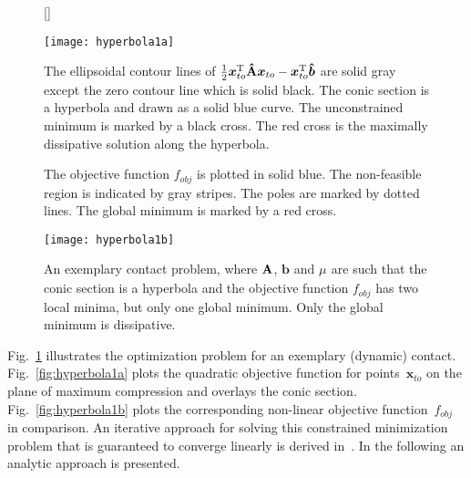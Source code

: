\documentclass[global,twocolumn]{svjour}
\let\vec\bm
\newcommand{\mat}[1]{{\bf #1}}
\newcommand{\transp}{{\mathrm{T}}}
\newcommand{\cof}[1]{\ensuremath{\mu_{#1}}}
\renewcommand{\figref}[1]{Fig.~\ref{#1}}
\begin{document}
			\begin{figure}
				\centering
					{
						\begin{subfloatrow}[1]%
								{\texttt{[image: hyperbola1a]}}
								{\caption{The ellipsoidal contour lines of $\frac{1}{2} \vec x_{to}^\transp \mat{\hat{A}} \vec x_{to} - \vec x_{to}^\transp \vec{\hat{b}}$ are solid gray except the zero contour line which is solid black. The conic section is a hyperbola and drawn as a solid blue curve. The unconstrained minimum is marked by a black cross. The red cross is the maximally dissipative solution along the hyperbola.}\label{fig:hyperbola1a}}
						\end{subfloatrow}
						\vspace{\parskip}

						\begin{subfloatrow}[1]%
							\floatbox{figure}
								{\caption{The objective function $f_{obj}$ is plotted in solid blue. The non-feasible region is indicated by gray stripes. The poles are marked by dotted lines. The global minimum is marked by a red cross.}\label{fig:hyperbola1b}}
								{\texttt{[image: hyperbola1b]}}
						\end{subfloatrow}
					}
					{\caption{An exemplary contact problem, where $\mat{A}$, $\vec{b}$ and $\cof{}$ are such that the conic section is a hyperbola and the objective function $f_{obj}$ has two local minima, but only one global minimum. Only the global minimum is dissipative.}\label{fig:hyperbola1}}
			\end{figure}
			\figref{fig:hyperbola1} illustrates the optimization problem for an
			exemplary (dynamic) contact. \figref{fig:hyperbola1a} plots the
			quadratic objective function for points~$\vec x_{to}$ on the plane
			of maximum compression and overlays the conic section.
			\figref{fig:hyperbola1b} plots the corresponding non-linear
			objective function~$f_{obj}$ in comparison. An iterative approach
			for solving this constrained minimization problem that is
			guaranteed to converge linearly is derived in~\cite{preclik14}.
			In the following an analytic approach is presented.
\end{document}
